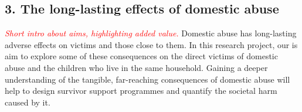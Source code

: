 \documentclass[11pt, a4paper]{article}
\begin{document}





%
%
%
%


\subsection*{3. The long-lasting effects of domestic abuse}


 \textcolor{red}{\textit{Short intro about aims, highlighting added value.}}
Domestic abuse has long-lasting adverse effects on victims and those close to them. In this research project, our is aim to explore some of these consequences on the direct victims of domestic abuse and the children who live in the same household. Gaining a deeper understanding of the tangible, far-reaching consequences of domestic abuse will help to design survivor support programmes and quantify the societal harm caused by it.
\end{document}
